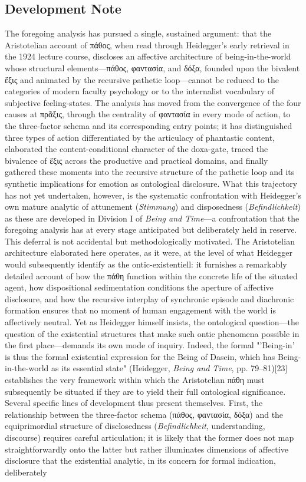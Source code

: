 \documentclass{article}
\begin{document}
\subsection*{Development Note}

The foregoing analysis has pursued a single, sustained argument: that the Aristotelian account of πάθος, when read through Heidegger's early retrieval in the 1924 lecture course, discloses an affective architecture of being-in-the-world whose structural elements—πάθος, φαντασία, and δόξα, founded upon the bivalent ἕξις and animated by the recursive pathetic loop—cannot be reduced to the categories of modern faculty psychology or to the internalist vocabulary of subjective feeling-states. The analysis has moved from the convergence of the four causes at πρᾶξις, through the centrality of φαντασία in every mode of action, to the three-factor schema and its corresponding entry points; it has distinguished three types of action differentiated by the articulacy of phantastic content, elaborated the content-conditional character of the doxa-gate, traced the bivalence of ἕξις across the productive and practical domains, and finally gathered these moments into the recursive structure of the pathetic loop and its synthetic implications for emotion as ontological disclosure. What this trajectory has not yet undertaken, however, is the systematic confrontation with Heidegger's own mature analytic of attunement (\textit{Stimmung}) and disposedness (\textit{Befindlichkeit}) as these are developed in Division I of \textit{Being and Time}—a confrontation that the foregoing analysis has at every stage anticipated but deliberately held in reserve. This deferral is not accidental but methodologically motivated. The Aristotelian architecture elaborated here operates, as it were, at the level of what Heidegger would subsequently identify as the ontic-existentiell: it furnishes a remarkably detailed account of how the πάθη function within the concrete life of the situated agent, how dispositional sedimentation conditions the aperture of affective disclosure, and how the recursive interplay of synchronic episode and diachronic formation ensures that no moment of human engagement with the world is affectively neutral. Yet as Heidegger himself insists, the ontological question—the question of the existential structures that make such ontic phenomena possible in the first place—demands its own mode of inquiry. Indeed, the formal "'Being-in' is thus the formal existential expression for the Being of Dasein, which has Being-in-the-world as its essential state" (Heidegger, \textit{Being and Time}, pp. 79–81)[23] establishes the very framework within which the Aristotelian πάθη must subsequently be situated if they are to yield their full ontological significance. Several specific lines of development thus present themselves. First, the relationship between the three-factor schema (πάθος, φαντασία, δόξα) and the equiprimordial structure of disclosedness (\textit{Befindlichkeit}, understanding, discourse) requires careful articulation; it is likely that the former does not map straightforwardly onto the latter but rather illuminates dimensions of affective disclosure that the existential analytic, in its concern for formal indication, deliberately 
\end{document}
